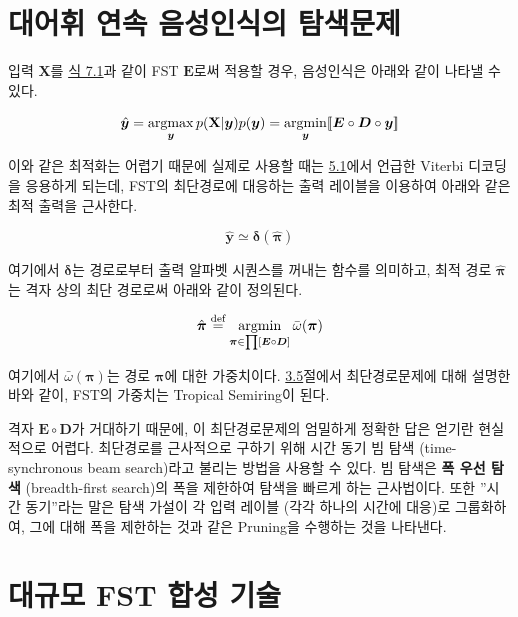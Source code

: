 \documentclass[../main.tex]{subfiles}
\begin{document}
\section{대어휘 연속 음성인식의 탐색문제}

입력 $\mathbf{X}$를 \hyperref[eq:7_1]{식 7.1}과 같이 FST $\bm{E}$로써 적용할 경우, 음성인식은 아래와 같이 나타낼 수 있다. 

\begin{equation}\label{eq:7_5}
    \hat{\bm{y}} = \operatorname*{argmax}_{\bm{y}} p( \mathbf{X} | \bm{y} ) p ( \bm{y} ) = \operatorname*{argmin}_{\bm{y}} [\![\bm{E} \circ \bm{D} \circ \bm{y}]\!]
\end{equation}

이와 같은 최적화는 어렵기 때문에 실제로 사용할 때는 \hyperref[sec:HMM]{5.1}에서 언급한 Viterbi 디코딩을 응용하게 되는데, FST의 최단경로에 대응하는 출력 레이블을 이용하여 아래와 같은 최적 출력을 근사한다. 

\begin{equation}\label{eq:7_6}
    \hat{\bm{y}} \simeq \bm{\delta}(\hat{\bm{\pi}})
\end{equation}

여기에서 $\bm{\delta}$는 경로로부터 출력 알파벳 시퀀스를 꺼내는 함수를 의미하고, 최적 경로 $\hat{\bm{\pi}}$는 격자 상의 최단 경로로써 아래와 같이 정의된다. 

\begin{equation}
    \hat{\bm{\pi}} \stackrel{\text{def}}{=} \operatorname*{argmin}_{\bm{\pi} \in \prod [ \bm{E} \circ \bm{D}] } \bar{\omega}(\bm{\pi})
\end{equation}

여기에서 $\bar{\omega} ( \bm{\pi})$는 경로 $\bm{\pi}$에 대한 가중치이다. 
\hyperref[sec:shortest-path]{3.5}절에서 최단경로문제에 대해 설명한 바와 같이, FST의 가중치는 Tropical Semiring이 된다. 

격자 $\bm{E} \circ \bm{D}$가 거대하기 때문에, 이 최단경로문제의 엄밀하게 정확한 답은 얻기란 현실적으로 어렵다. 
최단경로를 근사적으로 구하기 위해 시간 동기 빔 탐색 (time-synchronous beam search)라고 불리는 방법을 사용할 수 있다. 
빔 탐색은 \textbf{폭 우선 탐색} (breadth-first search)의 폭을 제한하여 탐색을 빠르게 하는 근사법이다. 
또한 ”시간 동기”라는 말은 탐색 가설이 각 입력 레이블 (각각 하나의 시간에 대응)로 그룹화하여, 그에 대해 폭을 제한하는 것과 같은 Pruning을 수행하는 것을 나타낸다. 

\section{대규모 FST 합성 기술}
\end{document}
